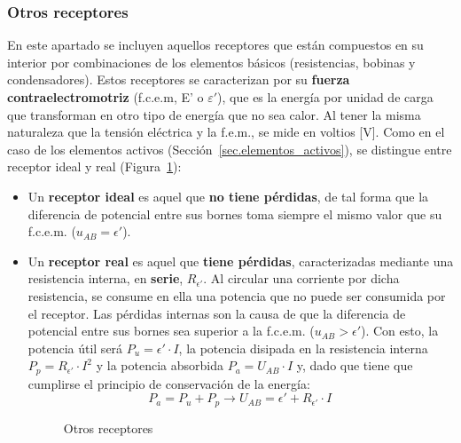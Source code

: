 	\subsubsection{Otros receptores}
	En este apartado se incluyen aquellos receptores que están compuestos en su interior por combinaciones de los elementos básicos (resistencias, bobinas y condensadores). Estos receptores se caracterizan por su \textbf{fuerza contraelectromotriz} (f.c.e.m, E' o $\varepsilon'$), que es la energía por unidad de carga que transforman en otro tipo de energía que no sea calor. Al tener la misma naturaleza que la tensión eléctrica y la f.e.m., se mide en voltios [V]. Como en el caso de los elementos activos (Sección~\ref{sec.elementos_activos}), se distingue entre receptor ideal y real (Figura~\ref{fig.receptores}):
	\begin{itemize}
		\item Un \textbf{receptor ideal} es aquel que \textbf{no tiene pérdidas}, de tal forma que la diferencia de potencial entre sus bornes toma siempre el mismo valor que su f.c.e.m. ($u_{AB}=\epsilon'$).
		\item Un \textbf{receptor real} es aquel que \textbf{tiene pérdidas}, caracterizadas mediante una resistencia interna, en \textbf{serie}, $R_{\epsilon'}$. Al circular una corriente por dicha resistencia, se consume en ella una potencia que no puede ser consumida por el receptor. Las pérdidas internas son la causa de que la diferencia de potencial entre sus bornes sea superior a la f.c.e.m. ($u_{AB}>\epsilon'$). Con esto, la potencia útil será $P_u=\epsilon'\cdot I$, la potencia disipada en la resistencia interna $P_p=R_{\epsilon'}\cdot I^2$ y la potencia absorbida $P_a=U_{AB}\cdot I$ y, dado que tiene que cumplirse el principio de conservación de la energía:
		\begin{equation}
			P_a=P_u+P_p\rightarrow \boxed{U_{AB}=\epsilon'+ R_{\epsilon'}\cdot I}\,
		\end{equation}
		\begin{figure}[H]
			\centering
			\hfil
			\caption{Otros receptores}
			\label{fig.receptores}
		\end{figure}
	\end{itemize}
	

